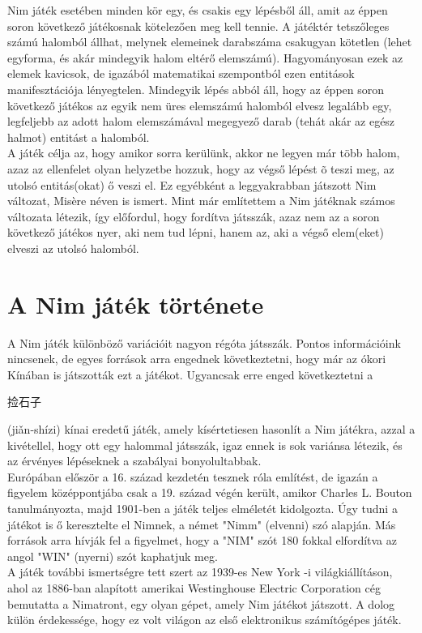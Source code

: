 Nim játék esetében minden kör egy, és csakis egy lépésből áll, amit az éppen soron következő játékosnak kötelezően meg kell tennie. A játéktér tetszőleges számú halomból állhat, melynek elemeinek darabszáma csakugyan kötetlen (lehet egyforma, és akár mindegyik halom eltérő elemszámú). Hagyományosan ezek az elemek kavicsok, de igazából matematikai szempontból ezen entitások manifesztációja lényegtelen. Mindegyik lépés abból áll, hogy az éppen soron következő játékos az egyik nem üres elemszámú halomból elvesz legalább egy, legfeljebb az adott halom elemszámával megegyező darab (tehát akár az egész halmot) entitást a halomból.\\

A játék célja az, hogy amikor sorra kerülünk, akkor ne legyen már több halom, azaz az ellenfelet olyan helyzetbe hozzuk, hogy az végső lépést õ teszi meg, az utolsó entitás(okat) ő veszi el. Ez egyébként a leggyakrabban játszott Nim változat, Misère néven is ismert. Mint már említettem a Nim játéknak számos változata létezik, így előfordul, hogy fordítva játsszák, azaz nem az a soron következő játékos nyer, aki nem tud lépni, hanem az, aki a végső elem(eket) elveszi az utolsó halomból.\\


\section{A Nim játék története}
A Nim játék különböző variációit nagyon régóta játsszák. Pontos információink nincsenek, de egyes források arra engednek következtetni, hogy már az ókori Kínában is játszották ezt a játékot. Ugyancsak erre enged következtetni a \begin{CJK*}{UTF8}{gbsn}捡石子\end{CJK*}
(jiǎn-shízi) kínai eredetű játék, amely kísértetiesen hasonlít a Nim játékra, azzal a kivétellel, hogy ott egy halommal játsszák, igaz ennek is sok variánsa létezik, és az érvényes lépéseknek a szabályai bonyolultabbak. \\
Európában először a 16. század kezdetén tesznek róla említést, de igazán a figyelem középpontjába csak a 19. század végén került, amikor Charles L. Bouton tanulmányozta, majd 1901-ben a játék teljes elméletét kidolgozta. Úgy tudni a játékot is ő keresztelte el Nimnek, a német "Nimm" (elvenni) szó alapján. Más források arra hívják fel a figyelmet, hogy a "NIM" szót 180 fokkal elfordítva az angol "WIN" (nyerni) szót kaphatjuk meg. \\
A játék további ismertségre tett szert az 1939-es New York -i világkiállításon, ahol az 1886-ban alapított amerikai Westinghouse Electric Corporation cég bemutatta a Nimatront, egy olyan gépet, amely Nim játékot játszott. A dolog külön érdekessége, hogy ez volt világon az első elektronikus számítógépes játék.

